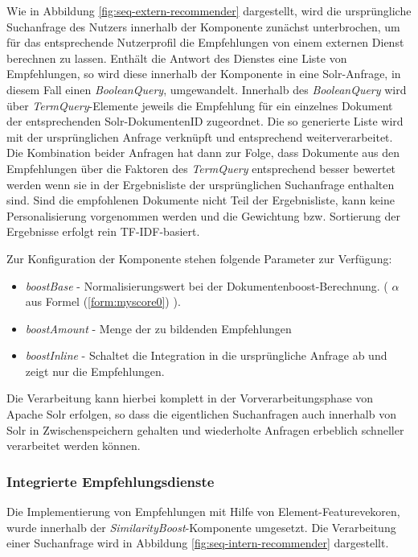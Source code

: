 Wie in Abbildung \ref{fig:seq-extern-recommender} dargestellt, wird die ursprüngliche Suchanfrage des Nutzers innerhalb der Komponente zunächst unterbrochen, um für das entsprechende Nutzerprofil die Empfehlungen von einem externen Dienst berechnen zu lassen. Enthält die Antwort des Dienstes eine Liste von Empfehlungen, so wird diese innerhalb der Komponente in eine Solr-Anfrage, in diesem Fall einen \textit{BooleanQuery}, umgewandelt. Innerhalb des \textit{BooleanQuery} wird über \textit{TermQuery}-Elemente jeweils die Empfehlung für ein einzelnes Dokument der entsprechenden Solr-DokumentenID zugeordnet. Die so generierte Liste wird mit der ursprünglichen Anfrage verknüpft und entsprechend weiterverarbeitet. Die Kombination beider Anfragen hat dann zur Folge, dass Dokumente aus den Empfehlungen über die Faktoren des \textit{TermQuery} entsprechend besser bewertet werden wenn sie in der Ergebnisliste der ursprünglichen Suchanfrage enthalten sind. Sind die empfohlenen Dokumente nicht Teil der Ergebnisliste, kann keine Personalisierung vorgenommen werden und die Gewichtung bzw. Sortierung der Ergebnisse erfolgt rein TF-IDF-basiert.

Zur Konfiguration der Komponente stehen folgende Parameter zur Verfügung:
\begin{itemize}
\item \textit{boostBase} - Normalisierungswert bei der Dokumentenboost-Berechnung. ( $\alpha$ aus Formel (\ref{form:myscore0}) ).
\item \textit{boostAmount} - Menge der zu bildenden Empfehlungen
\item \textit{boostInline} - Schaltet die Integration in die ursprüngliche Anfrage ab und zeigt nur die Empfehlungen.
\end{itemize}

Die Verarbeitung kann hierbei komplett in der Vorverarbeitungsphase von Apache Solr erfolgen, so dass die eigentlichen Suchanfragen auch innerhalb von Solr in Zwischenspeichern gehalten und wiederholte Anfragen erbeblich schneller verarbeitet werden können.

\subsubsection{Integrierte Empfehlungsdienste} \label{sec:implmodelcalc}

Die Implementierung von Empfehlungen mit Hilfe von Element-Featurevekoren, wurde innerhalb der \textit{SimilarityBoost}-Komponente umgesetzt. Die Verarbeitung einer Suchanfrage wird in Abbildung  \ref{fig:seq-intern-recommender} dargestellt.

